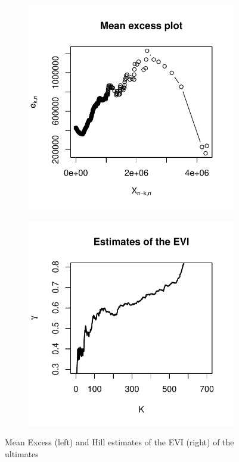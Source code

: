 \begin{figure}[t!] 
\centering
	\begin{subfigure}[t]{0.45\textwidth}
\includegraphics[width=\textwidth]{./plots/MeanExcess.pdf}
	\end{subfigure}
		\begin{subfigure}[t]{0.45\textwidth}
\includegraphics[width=\textwidth]{./plots/HillGPD.pdf}
	\end{subfigure}
	\caption{Mean Excess (left) and Hill estimates of the EVI (right) of the ultimates}
	\label{fig_hillgpd}
\end{figure}
